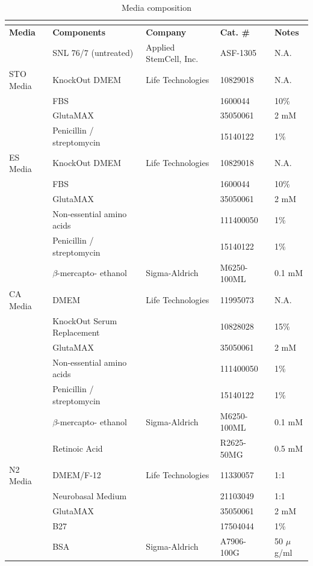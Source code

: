 \begin{longtabu} to \textwidth {X[1,l]X[1.4,l]X[1.5,l]X[1.4,r]X[0.8,r]}
  \caption{Media composition}\\
  \label{table:4-1}\\
  \toprule
    \textbf{Media} & \textbf{Components} & \textbf{Company} & \textbf{Cat. \#} & \textbf{Notes}\\
    \midrule
    \endhead
    & SNL 76/7 (untreated) & Applied StemCell, Inc. & ASF-1305 & N.A.\\
    \midrule
    STO Media & KnockOut DMEM & Life Technologies & 10829018 & N.A.\\
    & FBS & & 1600044 & 10\%\\
    & GlutaMAX & & 35050061 & 2 mM\\
    & Penicillin / streptomycin & & 15140122 & 1\%\\
    \midrule
    ES Media & KnockOut DMEM & Life Technologies & 10829018 & N.A.\\
    & FBS & & 1600044 & 10\%\\
    & GlutaMAX & & 35050061 & 2 mM\\
    & Non-essential amino acids & & 111400050 & 1\%\\
    & Penicillin / streptomycin & & 15140122 & 1\%\\
    & \( \beta \)-mercapto- ethanol & Sigma-Aldrich & M6250-100ML & 0.1 mM\\
    \midrule
    CA Media & DMEM & Life Technologies & 11995073 & N.A.\\
    & KnockOut Serum Replacement & & 10828028 & 15\%\\
    & GlutaMAX & & 35050061 & 2 mM\\
    & Non-essential amino acids & & 111400050 & 1\%\\
    & Penicillin / streptomycin & & 15140122 & 1\%\\
    & \( \beta \)-mercapto- ethanol & Sigma-Aldrich & M6250-100ML & 0.1 mM\\
    & Retinoic Acid & & R2625- 50MG & 0.5 mM\\
    \midrule
    N2 Media & DMEM/F-12 & Life Technologies & 11330057 & 1:1\\
    & Neurobasal Medium & & 21103049 & 1:1\\
    & GlutaMAX & & 35050061 & 2 mM\\    
    & B27 & & 17504044 & 1\%\\
    & BSA & Sigma-Aldrich & A7906- 100G & 50 \( \mu \)g/ml\\

\end{longtabu}
